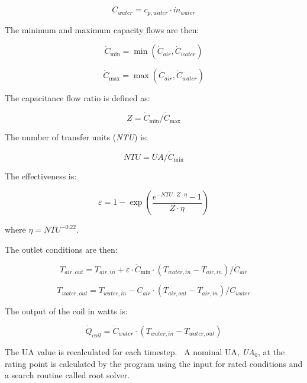 \begin{equation}
{\dot C_{water}} = {c_{p,water}}\cdot {\dot m_{water}}
\end{equation}

The minimum and maximum capacity flows are then:

\begin{equation}
{\dot C_{\min }} = \min ({\dot C_{air}},{\dot C_{water}})
\end{equation}

\begin{equation}
{\dot C_{\max }} = \max ({\dot C_{air}},{\dot C_{water}})
\end{equation}

The capacitance flow ratio is defined as:

\begin{equation}
Z = {\dot C_{\min }}/{\dot C_{\max }}
\end{equation}

The number of transfer units (\emph{NTU}) is:

\begin{equation}
NTU = UA/{\dot C_{\min }}
\end{equation}

The effectiveness is:

\begin{equation}
\varepsilon  = 1 - \exp (\frac{{{e^{ - NTU \cdot Z \cdot \eta }} - 1}}{{Z \cdot \eta }})
\end{equation}

where \(\eta = NT{U^{ - 0.22}}\).

The outlet conditions are then:

\begin{equation}
{T_{air,out}} = {T_{air,in}} + \varepsilon \cdot {\dot C_{\min }}\cdot ({T_{water,in}} - {T_{air,in}})/{\dot C_{air}}
\end{equation}

\begin{equation}
{T_{water,out}} = {T_{water,in}} - {\dot C_{air}}\cdot ({T_{air,out}} - {T_{air,in}})/{\dot C_{water}}
\end{equation}

The output of the coil in watts is:

\begin{equation}
{\dot Q_{coil}} = {\dot C_{water}}\cdot ({T_{water,in}} - {T_{water,out}})
\end{equation}

The UA value is recalculated for each timestep.~ A nominal UA, \emph{UA\(_{0}\)}, at the rating point is calculated by the program using the input for rated conditions and a search routine called root solver.

